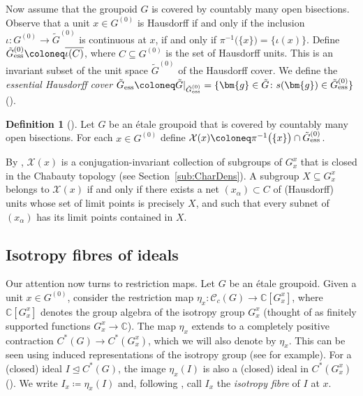 \documentclass[11pt, oneside, reqno]{amsart}
\newcommand{\Gu}{G^{(0)}}
\newcommand{\cg}{\mathscr{C}_c(G)}
\newcommand{\ess}{{\rm{ess}}}
\newcommand{\tiG}{\tilde{G}}
\newcommand{\tiGu}{\tilde{G}^{(0)}}
\newcommand{\PRLsep}{\noindent\makebox[\linewidth]{\resizebox{0.3333\linewidth}{1pt}{$\bullet$}}\bigskip}
\theoremstyle{definition}
\newtheorem{dfn}[thm]{Definition}
\theoremstyle{remark}
\numberwithin{equation}{section}
\begin{document}
\vspace{0.3cm}
Now assume that the groupoid $G$ is covered by countably many open bisections. Observe that a unit $x \in \Gu$ is Hausdorff if and only if the inclusion $\iota \colon \Gu \to \tiGu$ is continuous at $x$, if and only if $\pi^{-1}\big(\{x\}\big) = \{\iota(x)\}$. Define $\tiGu_\ess \coloneq \overline{\iota(C)}$, where $C \subseteq \Gu$ is the set of Hausdorff units. This is an invariant subset of the unit space $\tiGu$ of the Hausdorff cover. We define the \emph{essential Hausdorff cover} $\tiG_\ess \coloneq \tiG|_{\tiGu_\ess} = \{\bm{g} \in \tiG \colon s(\bm{g}) \in \tiGu_\ess\}$ (\cite[Definition~4.13]{BGHL}).

\begin{dfn}[\cite{Hume}] \label{dfn:mathcalX(x)}
Let $G$ be an \'etale groupoid that is covered by countably many open bisections. For each $x\in \Gu$ define $\mathcal{X}(x) \coloneq \pi^{-1}\big(\{x\}\big)\cap\tiGu_{\ess}$.
\end{dfn}
By \cite{Hume}, $\mathcal{X}(x)$ is a conjugation-invariant collection of subgroups of $G^x_x$ that is closed in the Chabauty topology (see Section~\ref{sub:CharDens}). A subgroup $X \subseteq G^x_x$ belongs to $\mathcal{X}(x)$ if and only if there exists a net $(x_\alpha) \subset C$ of (Hausdorff) units whose set of limit points is precisely $X$, and such that every subnet of $(x_{\alpha})$ has its limit points contained in $X$.

\PRLsep

\subsection{Isotropy fibres of ideals}\label{prelim:IsoFibIdeals}

Our attention now turns to restriction maps. Let $G$ be an \'etale groupoid. Given a unit $x \in \Gu$, consider the restriction map $\eta_x \colon \cg \to \mathbb{C}[G^x_x]$, where $\mathbb{C}[G^x_x]$ denotes the group algebra of the isotropy group $G^x_x$ (thought of as finitely supported functions $G^{x}_{x}\to\mathbb{C}$). The map $\eta_x$ extends to a completely positive contraction $C^*(G) \to C^*(G^x_x)$, which we will also denote by $\eta_x$. This can be seen using induced representations of the isotropy group (see \cite[Lemma~1.2]{CN22} for example). For a (closed) ideal $I \trianglelefteq C^*(G)$, the image $\eta_x(I)$ is also a (closed) ideal in $C^*(G^x_x)$ (\cite[Lemma~2.1]{CN24}). We write $I_x \coloneq \eta_x(I)$ and, following \cite{CN24}, call $I_x$ the \emph{isotropy fibre} of $I$ at $x$. 
\end{document}
